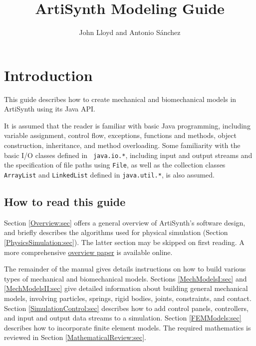 \documentclass{article}
\title{ArtiSynth Modeling Guide}
\author{John Lloyd and Antonio S\'anchez}
\date{}
\begin{document}
\maketitle

\iflatexml{\large\pubdate}\fi

\tableofcontents


\section{Introduction}

This guide describes how to create mechanical and biomechanical models
in ArtiSynth using its Java API. 

It is assumed that the reader is familiar with basic Java programming,
including variable assignment, control flow, exceptions, functions and
methods, object construction, inheritance, and method overloading.
Some familiarity with the basic I/O classes defined in {\tt
java.io.*}, including input and output streams and the specification
of file paths using {\tt File}, as well as the collection classes
{\tt ArrayList} and {\tt LinkedList} defined in {\tt java.util.*}, is
also assumed.

\subsection{How to read this guide}

Section \ref{Overview:sec} offers a general overview of ArtiSynth's
software design, and briefly describes the algorithms used for
physical simulation (Section \ref{PhysicsSimulation:sec}). The latter
section may be skipped on first reading. A more comprehensive
\href{http://www.artisynth.org/doc/artisynth.pdf}{overview paper} is
available online.

The remainder of the manual gives details instructions on how to build
various types of mechanical and biomechanical models.  Sections
\ref{MechModelsI:sec} and \ref{MechModelsII:sec} give detailed
information about building general mechanical models, involving
particles, springs, rigid bodies, joints, constraints, and
contact. Section \ref{SimulationControl:sec} describes how to add
control panels, controllers, and input and output data streams to a
simulation.  Section \ref{FEMModels:sec} describes how to incorporate
finite element models. The required mathematics is reviewed in Section
\ref{MathematicalReview:sec}.
\end{document}
